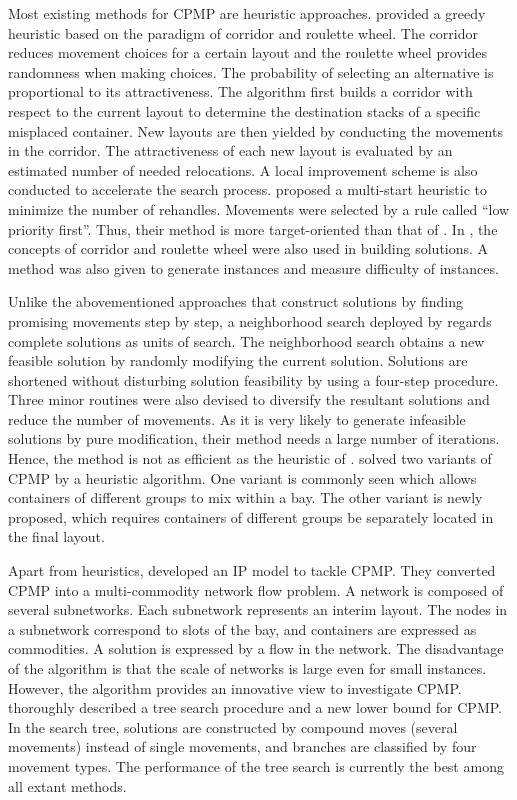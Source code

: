 \documentclass[review,3p,times,authoryear,12pt]{elsarticle}
\begin{document}
Most existing methods for CPMP are heuristic approaches. \cite{Caserta2009} provided a greedy heuristic based on the paradigm of corridor and roulette wheel. The corridor reduces movement choices for a certain layout and the roulette wheel provides randomness when making choices. The probability of selecting an alternative is proportional to its attractiveness.
The algorithm first builds a corridor with respect to the current layout to determine the destination stacks of a specific misplaced container. New layouts are then yielded by conducting the movements in the corridor. The attractiveness of each new layout is evaluated by an estimated number of needed relocations. A local improvement scheme is also conducted to accelerate the search process.
\cite{Exposito2012} proposed a multi-start heuristic to minimize the number of rehandles. Movements were selected by a rule called ``low priority first''. Thus, their method is more target-oriented than that of \cite{Caserta2009}. In \cite{Exposito2012}, the concepts of corridor and roulette wheel were also used in building solutions. A method was also given to generate instances and measure difficulty of instances.

Unlike the abovementioned approaches that construct solutions by finding promising movements step by step, a neighborhood search deployed by \cite{Lee2009} regards complete solutions as units of search. The neighborhood search obtains a new feasible solution by randomly modifying the current solution.
Solutions are shortened without disturbing solution feasibility by using a four-step procedure. Three minor routines were also devised to diversify the resultant solutions and reduce the number of movements. As it is very likely to generate infeasible solutions by pure modification, their method needs a large number of iterations. Hence, the method is not as efficient as the heuristic of \cite{Exposito2012}.
\cite{Huang2012heu} solved two variants of CPMP by a heuristic algorithm. One variant is commonly seen which allows containers of different groups to mix within a bay. The other variant is newly proposed, which requires containers of different groups be separately located in the final layout.

Apart from heuristics, \cite{Lee2007} developed an IP model to tackle CPMP. They converted CPMP into a multi-commodity network flow problem. A network is composed of several subnetworks. Each subnetwork represents an interim layout.
The nodes in a subnetwork correspond to slots of the bay, and containers are expressed as commodities. A solution is expressed by a flow in the network. The disadvantage of the algorithm is that the scale of networks is large even for small instances.
However, the algorithm provides an innovative view to investigate CPMP.
\cite{BF2012} thoroughly described a tree search procedure and a new lower bound for CPMP. In the search tree, solutions are constructed by compound moves (several movements) instead of single movements, and branches are classified by four movement types. The performance of the tree search is currently the best among all extant methods.
\end{document}
